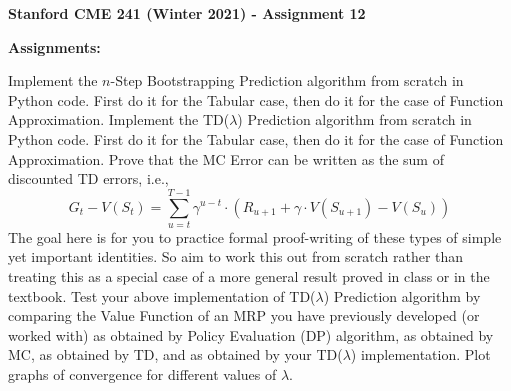 \documentclass[12pt]{exam}
\begin{document}
\begin{center}
{\large {\bf Stanford CME 241 (Winter 2021) - Assignment 12}}
\end{center}
 
{\large{\bf Assignments:}}
\begin{questions}
\question Implement the $n$-Step Bootstrapping Prediction algorithm from scratch in Python code. First do it for the Tabular case, then do it for the case of Function Approximation.
\question Implement the TD($\lambda$) Prediction algorithm from scratch in Python code. First do it for the Tabular case, then do it for the case of Function Approximation.
\question Prove that the MC Error can be written as the sum of discounted TD errors, i.e.,
$$G_t - V(S_t) = \sum_{u=t}^{T-1} \gamma^{u-t} \cdot (R_{u+1} + \gamma \cdot V(S_{u+1}) - V(S_u))$$
The goal here is for you to practice formal proof-writing of these types of simple yet important identities. So aim to work this out from scratch rather than treating this as a special case of a more general result proved in class or in the textbook.
\question Test your above implementation of TD($\lambda$) Prediction algorithm by comparing the Value Function of an MRP you have previously developed (or worked with) as obtained by Policy Evaluation (DP) algorithm, as obtained by MC, as obtained by TD, and as obtained by your TD($\lambda$) implementation. Plot graphs of convergence for different values of $\lambda$.
\end{questions}
\end{document}
